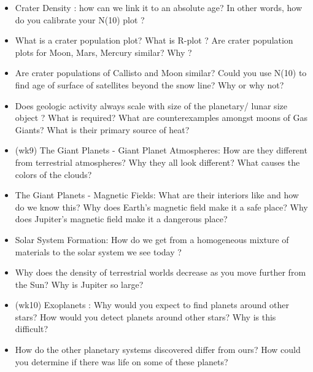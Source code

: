 \documentclass[paper=a4, fontsize=11pt]{scrartcl} %
\numberwithin{equation}{section} %
\begin{document}
\begin{itemize}

\item Crater Density : how can we link it to  an absolute age?  In other words, how do you calibrate your N(10) plot  ? 
\item What is a crater population plot? What is R-plot ? Are crater population plots for Moon, Mars, Mercury similar?  Why  ? 
\item Are crater populations of Callisto and Moon  similar? Could you use N(10) to find age of surface of satellites beyond the snow line? Why or why not? 
\item Does geologic activity always scale with size of the planetary/ lunar size object ? What is required? What are counterexamples amongst moons of Gas Giants? What is their  primary  source of heat? 
\item  (wk9) The Giant Planets  - Giant Planet Atmospheres: How are they different from terrestrial atmospheres?
Why  they all look different?  What causes the colors of the clouds?
\item  The Giant Planets  - Magnetic Fields:   What are their interiors like and how do we know this?
Why does Earth's magnetic field make it a safe place?  Why does Jupiter's magnetic field make it a dangerous place?
\item   Solar System Formation: How do we get from a homogeneous mixture of materials to the solar system we see today ? 
\item  Why does the density of terrestrial worlds decrease as you move further from the Sun? Why is Jupiter so large?
\item (wk10)  Exoplanets : Why would you expect to find planets around other
stars?  How would you detect planets around other stars?   Why is this difficult?
\item  How do the other planetary systems discovered differ from ours?   How could you determine if there was life on some of these planets?


\end{itemize}



\end{document}

